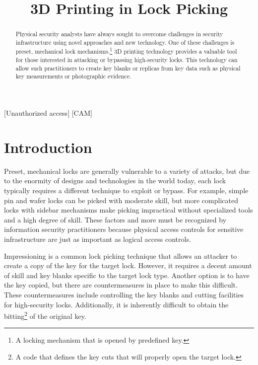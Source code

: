 \documentclass{acm_proc_article-sp}
\title{3D Printing in Lock Picking}
\begin{document}
\maketitle

\begin{abstract}
    Physical security analysts have always sought to overcome challenges in security infrastructure using novel approaches and new technology. One of these challenges is preset, mechanical lock mechanisms.\footnote{A locking mechanism that is opened by predefined key.} 3D printing technology provides a valuable tool for those interested in attacking or bypassing high-security locks. This technology can allow such practitioners to create key blanks or replicas from key data such as physical key measurements or photographic evidence.
\end{abstract}

[Unauthorized access] 
[CAM]


\section{Introduction}
Preset, mechanical locks are generally vulnerable to a variety of attacks, but due to the enormity of designs and technologies in the world today, each lock typically requires a different technique to exploit or bypass. For example, simple pin and wafer locks can be picked with moderate skill, but more complicated locks with sidebar mechanisms make picking impractical without specialized tools and a high degree of skill. These factors and more must be recognized by information security practitioners because physical access controls for sensitive infrastructure are just as important as logical access controls.

Impressioning is a common lock picking technique that allows an attacker to create a copy of the key for the target lock. However, it requires a decent amount of skill and key blanks specific to the target lock type. Another option is to have the key copied, but there are countermeasures in place to make this difficult. These countermeasures include controlling the key blanks and cutting facilities for high-security locks. Additionally, it is inherently difficult to obtain the bitting\footnote{A code that defines the key cuts that will properly open the target lock.} of the original key.
\end{document}
